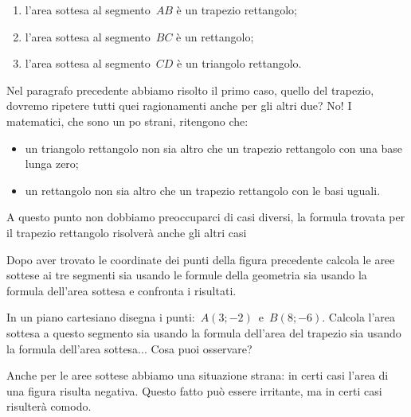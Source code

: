 
\begin{center} \areasottesamolti \end{center}
\begin{enumerate} [nosep]
 \item l'area sottesa al segmento~\(AB\) è un trapezio rettangolo;
 \item l'area sottesa al segmento~\(BC\) è un rettangolo;
 \item l'area sottesa al segmento~\(CD\) è un triangolo rettangolo.
\end{enumerate}

Nel paragrafo precedente abbiamo risolto il primo caso, quello del trapezio,
dovremo ripetere tutti quei ragionamenti anche per gli altri due? No! 
I matematici, che sono un po strani, ritengono che:

\begin{itemize} [noitemsep]
 \item 
  un triangolo rettangolo
  non sia altro che un trapezio rettangolo con una base lunga zero;
 \item 
  un rettangolo
  non sia altro che un trapezio rettangolo con le basi uguali.
\end{itemize}

A questo punto non dobbiamo preoccuparci di casi diversi, la formula trovata 
per il trapezio rettangolo risolverà anche gli altri casi

 \begin{esempio}
\label{ex:D.18}
  Dopo aver trovato le coordinate dei punti della figura precedente calcola
  le aree sottese ai tre segmenti sia usando le formule della geometria
  sia usando la formula dell'area sottesa e confronta i risultati.
 \end{esempio}

 \begin{esempio}
  In un piano cartesiano disegna i punti:~\(A(3; -2)\)~e~\(B(8; -6)\). 
  Calcola l'area sottesa a questo segmento sia usando la formula 
  dell'area del trapezio sia usando la formula dell'area sottesa...
  Cosa puoi osservare?
 \end{esempio}

Anche per le aree sottese abbiamo una situazione strana: in certi casi 
l'area di una figura risulta negativa. Questo fatto può essere irritante, 
ma in certi casi risulterà comodo.

